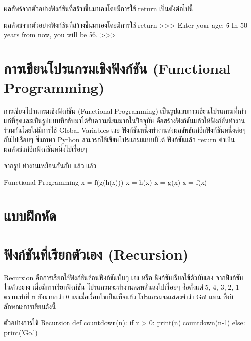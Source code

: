 ผลลัพธ์จากตัวอย่างฟังก์ชันที่สร้างขึ้นมาเองโดยมีการใช้ return เป็นดังต่อไปนี้

\begin{codelist}{ผลลัพธ์จากตัวอย่างฟังก์ชันที่สร้างขึ้นมาเองโดยมีการใช้ return}{}
>>>
Enter your age: 6
In 50 years from now, you will be  56.
>>> 
\end{codelist}

\section{การเขียนโปรแกรมเชิงฟังก์ชัน (Functional Programming)}


การเขียนโปรแกรมเชิงฟังก์ชัน (Functional Programming) เป็นรูปแบบการเขียนโปรแกรมที่เก่าแก่ที่สุดและเป็นรูปแบบที่กลับมาได้รับความนิยมมากในปัจจุบัน คือสร้างฟังก์ชันแล้วให้ฟังก์ชันทำงานร่วมกันโดยไม่มีการใช้ Global Variables เลย ฟังก์ชันหนึ่งทำงานส่งผลลัพธ์แก่อีกฟังก์ชันหนึ่งต่อๆ กันไปเรื่อยๆ ซึ่งภาษา Python สามารถใช้เขียนโปรแกรมแบบนี้ได้ ฟังก์ชันแล้ว return ค่าเป็นผลลัพธ์แก่อีกฟังก์ชันหนึ่งไปเรื่อยๆ  

จากรูป   ทำงานเหมือนกันกับ  แล้ว   แล้ว  

\begin{codelist}{Functional Programming}{}
x = f(g(h(x)))
x = h(x)
x = g(x)
x = f(x)
\end{codelist}


\section{แบบฝึกหัด}

\section{ฟังก์ชันที่เรียกตัวเอง (Recursion)}

Recursion คือการเรียกใช้ฟังก์ชันซ้อนฟังก์ชันนั้นๆ เอง หรือ ฟังก์ชันเรียกใช้ตัวมันเอง จากฟังก์ชัน   ในตัวอย่าง เมื่อมีการเรียกฟังก์ชัน   โปรแกรมจะทำงานลดหลั่นลงไปเรื่อยๆ คือตั้งแต่ 5, 4, 3, 2, 1 ตราบเท่าที่ n ยังมากกว่า 0 แต่เมื่อเงื่อนไขเป็นเท็จแล้ว โปรแกรมจะแสดงคำว่า Go! แทน ซึ่งมีลักษณะการเขียนดังนี้


\begin{codelist}{ตัวอย่างการใช้ Recursion}{}
def countdown(n):
    if x > 0:
        print(n)
        countdown(n-1)
    else:
        print('Go.')
\end{codelist}

